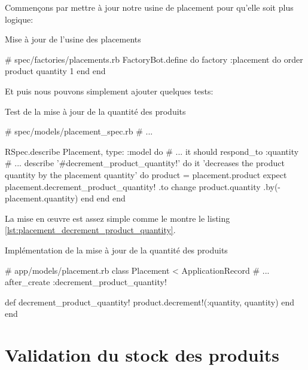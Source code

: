 \documentclass[]{report}
\begin{document}
    Commençons par mettre à jour notre usine de placement pour qu'elle soit plus logique:

      \begin{listing}
        \caption{Mise à jour de l'usine des placements}
        \begin{rubycode}
        # spec/factories/placements.rb
        FactoryBot.define do
          factory :placement do
            order
            product
            quantity { 1 }
          end
        end
        \end{rubycode}
      \end{listing}

    Et puis nous pouvons simplement ajouter quelques tests:

    \begin{listing}
      \caption{Test de la mise à jour de la quantité des produits}
      \begin{rubycode}
      # spec/models/placement_spec.rb
      # ...

      RSpec.describe Placement, type: :model do
        # ...
        it { should respond_to :quantity }
        # ...
        describe '#decrement_product_quantity!' do
          it 'decreases the product quantity by the placement quantity' do
            product = placement.product
            expect { placement.decrement_product_quantity! }.to change { product.quantity }.by(-placement.quantity)
          end
        end
      end
      \end{rubycode}
    \end{listing}

    La mise en œuvre est assez simple comme le montre le listing \ref{lst:placement_decrement_product_quantity}.

    \begin{listing}
      \caption{Implémentation de la mise à jour de la quantité des produits}
      \label{lst:placement_decrement_product_quantity}
      \begin{rubycode}
      # app/models/placement.rb
      class Placement < ApplicationRecord
        # ...
        after_create :decrement_product_quantity!

        def decrement_product_quantity!
          product.decrement!(:quantity, quantity)
        end
      end
      \end{rubycode}
    \end{listing}

  \section{Validation du stock des produits}
\end{document}
